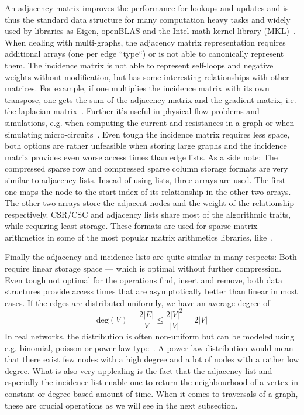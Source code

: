         An adjacency matrix improves the performance for lookups and updates and is thus the standard data structure for many computation heavy tasks and widely used by libraries as Eigen, openBLAS and the Intel math kernel library (MKL)~\autocite{MatrixStorageSchemes-2021-03-05, EigenTheMatrixclass-2020-12-05, MatrixStorageSchemes-1999-10-01}. 
        When dealing with multi-graphs, the adjacency matrix representation requires additional arrays (one per edge ``type``) or is not able to canonically represent them.       
        The incidence matrix is not able to represent self-loops and negative weights without modification, but has some interesting relationships with other matrices. 
        For example, if one multiplies the incidence matrix with its own transpose, one gets the sum of the adjacency matrix and the gradient matrix, i.e. the laplacian matrix~\autocite{brouwer2011spectra}. 
        Further it's useful in physical flow problems and simulations, e.g. when computing the current and resistances in a graph or when simulating micro-circuits~\autocite{weinberg1958kirchhoff}.
        Even tough the incidence matrix requires less space, both options are rather unfeasible when storing large graphs and the incidence matrix provides even worse access times than edge lists.        
        As a side note: The compressed sparse row and compressed sparse column storage formats are very similar to adjacency lists. 
        Insead of using lists, three arrays are used. 
        The first one maps the node to the start index of its relationship in the other two arrays. 
        The other two arrays store the adjacent nodes and the weight of the relationship respectively. 
        CSR/CSC and adjacency lists share most of the algorithmic traits, while requiring least storage. 
        These formats are used for sparse matrix arithmetics in some of the most popular matrix arithmetics libraries, like~\autocite{MatrixStorageSchemes-2021-03-05, EigenTheMatrixclass-2020-12-05, MatrixStorageSchemes-1999-10-01}. 
        
        Finally the adjacency and incidence lists are quite similar in many respects: Both require linear storage space --- which is optimal without further compression. 
        Even tough not optimal for the operations find, insert and remove, both data structures provide access times that are asymptotically better than linear in most cases.
        If the edges are distributed uniformly, we have an average degree of 
        \[ \text{deg}(V) = \frac{2|E|}{|V|} \leq \frac{2 |V|^2}{|V|} = 2 |V| \]
        In real networks, the distribution is often non-uniform but can be modeled using e.g. binomial, poisson or power law type~\autocite{holme2019rare}. 
        A power law distribution would mean that there exist few nodes with a high degree and a lot of nodes with a rather low degree. 
        What is also very applealing is the fact that the adjacency list and especially the incidence list enable one to return the neighbourhood of a vertex in constant or degree-based amount of time. 
        When it comes to traversals of a graph, these are crucial operations as we will see in the next subsection. 
        
